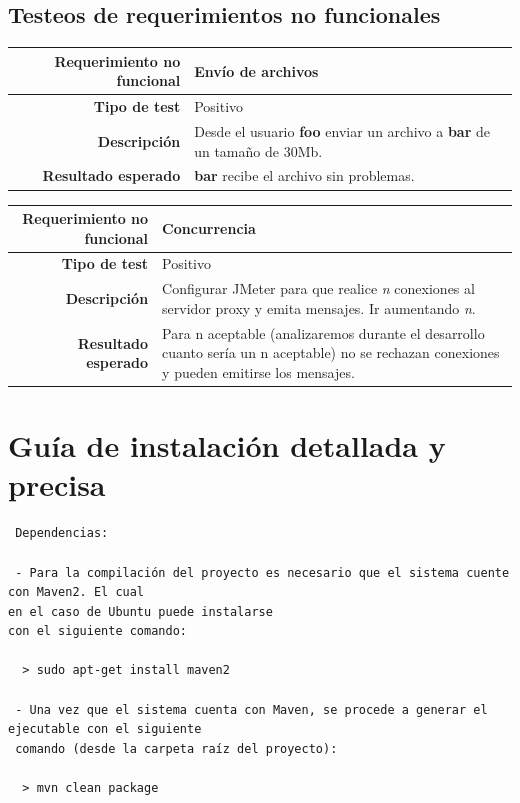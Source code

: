 \documentclass[a4paper,10pt]{article}
\begin{document}
\subsection{Testeos de requerimientos no funcionales}

\begin{center}
  \begin{tabular}{|r|p{12.5cm}|}
    \hline
    \textbf{Requerimiento no funcional}	& Envío de archivos\\
    \hline
    \textbf{Tipo de test}	&	Positivo\\
    \hline
    \textbf{Descripción}	&	Desde el usuario \textbf{foo} enviar un archivo a \textbf{bar} de un tamaño de 30Mb.\\
    \hline
    \textbf{Resultado esperado}	&	\textbf{bar} recibe el archivo sin problemas.\\
    \hline   
  \end{tabular}
\end{center}

\begin{center}
  \begin{tabular}{|r|p{12.5cm}|}
    \hline
    \textbf{Requerimiento no funcional}	& Concurrencia\\
    \hline
    \textbf{Tipo de test}	&	Positivo\\
    \hline
    \textbf{Descripción}	&	Configurar JMeter para que realice \textit{n} conexiones al servidor proxy y emita mensajes.
					Ir aumentando \textit{n}.\\
    \hline
    \textbf{Resultado esperado}	&	Para n aceptable (analizaremos durante el desarrollo cuanto sería un n aceptable) no se rechazan conexiones y pueden emitirse los mensajes.\\
    \hline   
  \end{tabular}
\end{center}

\section{Guía de instalación detallada y precisa}

\begin{verbatim}
 Dependencias:

 - Para la compilación del proyecto es necesario que el sistema cuente con Maven2. El cual 
en el caso de Ubuntu puede instalarse
con el siguiente comando:

  > sudo apt-get install maven2

 - Una vez que el sistema cuenta con Maven, se procede a generar el ejecutable con el siguiente
 comando (desde la carpeta raíz del proyecto):

  > mvn clean package
\end{verbatim}
\end{document}
